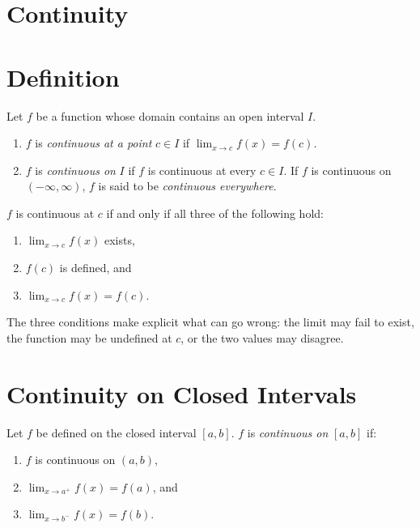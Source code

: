 \section{Continuity}

\section*{Definition}

\begin{tcolorbox}[colback=propbox, colframe=propborder, arc=2pt,
  left=6pt, right=6pt, top=4pt, bottom=4pt,
  title={\small\textbf{Definition (Continuous Function)}},
  fonttitle=\small\bfseries]
Let $f$ be a function whose domain contains an open interval $I$.
\begin{enumerate}
  \item $f$ is \emph{continuous at a point} $c \in I$ if
        $\displaystyle\lim_{x \to c} f(x) = f(c)$.
  \item $f$ is \emph{continuous on} $I$ if $f$ is continuous at
        every $c \in I$. If $f$ is continuous on $(-\infty, \infty)$,
        $f$ is said to be \emph{continuous everywhere}.
\end{enumerate}
\end{tcolorbox}

\begin{remark*}
$f$ is continuous at $c$ if and only if all three of the following hold:
\begin{enumerate}
  \item $\displaystyle\lim_{x \to c} f(x)$ exists,
  \item $f(c)$ is defined, and
  \item $\displaystyle\lim_{x \to c} f(x) = f(c)$.
\end{enumerate}
The three conditions make explicit what can go wrong: the limit may
fail to exist, the function may be undefined at $c$, or the two
values may disagree.
\end{remark*}

\section*{Continuity on Closed Intervals}

\begin{tcolorbox}[colback=propbox, colframe=propborder, arc=2pt,
  left=6pt, right=6pt, top=4pt, bottom=4pt,
  title={\small\textbf{Definition (Continuity on Closed Intervals)}},
  fonttitle=\small\bfseries]
Let $f$ be defined on the closed interval $[a, b]$.
$f$ is \emph{continuous on} $[a, b]$ if:
\begin{enumerate}
  \item $f$ is continuous on $(a, b)$,
  \item $\displaystyle\lim_{x \to a^+} f(x) = f(a)$, and
  \item $\displaystyle\lim_{x \to b^-} f(x) = f(b)$.
\end{enumerate}
\end{tcolorbox}

